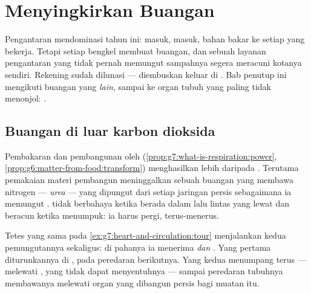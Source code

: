 \chapter{Menyingkirkan Buangan}\label{ch:g7:removing-wastes}

Pengantaran mendominasi tahun ini:  masuk,  masuk,
bahan bakar ke setiap  yang bekerja. Tetapi setiap bengkel membuat
buangan, dan sebuah layanan pengantaran yang tidak pernah memungut
sampahnya segera meracuni kotanya sendiri. Rekening  sudah dilunasi --- diembuskan keluar di . Bab
penutup ini mengikuti buangan yang \emph{lain}, sampai ke organ tubuh
yang paling tidak menonjol: .

\section{Buangan di luar karbon dioksida}

\begin{proposition}\label{prop:g7:removing-wastes:rubbish}
Pembakaran dan pembangunan oleh 
(\cref{prop:g7:what-is-respiration:power},
\cref{prop:g6:matter-from-food:transform}) menghasilkan lebih daripada
. Terutama pemakaian  materi pembangun
meninggalkan sebuah buangan yang membawa nitrogen ---
\emph{urea} --- yang dipungut  dari setiap
jaringan persis sebagaimana ia memungut .  tidak
berbahaya ketika berada dalam lalu lintas yang lewat dan beracun
ketika menumpuk: ia harus pergi, terus-menerus.
\end{proposition}
\admitted

\begin{example}\label{ex:g7:removing-wastes:rounds}
Tetes yang sama pada \cref{ex:g7:heart-and-circulation:tour}
menjalankan kedua pemungutannya sekaligus: di  pahanya ia
menerima  \emph{dan} . Yang pertama diturunkannya
di , pada peredaran berikutnya. Yang kedua menumpang terus
--- melewati , yang tidak dapat menyentuhnya --- sampai
peredaran tubuhnya membawanya melewati organ yang dibangun persis bagi
muatan itu.
\end{example}

